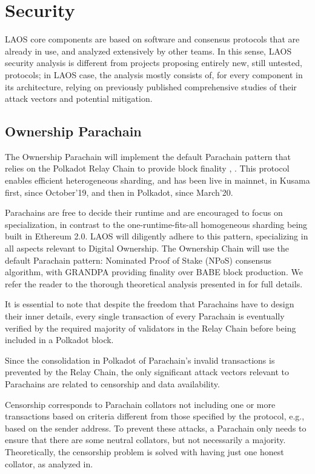 \section{Security}\label{security}

LAOS core components are based on software and consensus protocols
that are already in use,
and analyzed extensively by other teams.
In this sense, LAOS security analysis is different from 
projects proposing entirely new, still untested, protocols;
in LAOS case, the analysis mostly consists of, for every component
in its architecture, relying on previously published
comprehensive studies of their attack vectors and potential mitigation.

\subsection{Ownership Parachain}\label{sec:security-parachain}

The Ownership Parachain will
implement the default Parachain pattern that relies on the Polkadot
Relay Chain to provide block finality \cite{parachain-protocol}, \cite{parachain-protocol2}.
This protocol enables efficient heterogeneous sharding,
and has been live in mainnet, in Kusama first, since
October'19, and then in Polkadot, since March'20.

Parachains are free to decide their runtime and are encouraged to focus on 
specialization, in contrast to the one-runtime-fits-all
homogeneous sharding being built in Ethereum 2.0.
LAOS will diligently adhere to this pattern,
specializing in all aspects relevant to Digital Ownership.
The Ownership Chain will use the default Parachain pattern:
Nominated Proof of Stake (NPoS) consensus algorithm,
with GRANDPA providing finality over BABE block production.
We refer the reader to the thorough theoretical analysis presented in\cite{polkadotExplained}
for full details.

It is essential to note that despite the freedom that Parachains have to design
their inner details, every single transaction of every Parachain is eventually
verified by the required majority of validators in the Relay Chain before
being included in a Polkadot block. 

Since the consolidation in Polkadot of Parachain's 
invalid transactions is prevented by the Relay Chain, 
the only significant attack vectors relevant to Parachains
are related to censorship and data availability.

Censorship corresponds to Parachain collators not including one or more
transactions based on criteria different from those specified by the
protocol, e.g., based on the sender address. To prevent these attacks,
a Parachain only needs to ensure that there are some neutral collators,
but not necessarily a majority.
Theoretically, the censorship problem is solved with 
having just one honest collator,
as analyzed in\cite{collators}.

